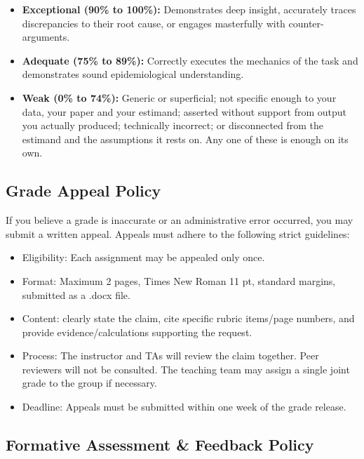 \documentclass[
]{article}
\providecommand{\tightlist}{%
  \setlength{\itemsep}{0pt}\setlength{\parskip}{0pt}}
\begin{document}
\begin{itemize}
\tightlist
\item
  \textbf{Exceptional (90\% to 100\%):} Demonstrates deep insight,
  accurately traces discrepancies to their root cause, or engages
  masterfully with counter-arguments.
\item
  \textbf{Adequate (75\% to 89\%):} Correctly executes the mechanics of
  the task and demonstrates sound epidemiological understanding.
\item
  \textbf{Weak (0\% to 74\%):} Generic or superficial; not specific
  enough to your data, your paper and your estimand; asserted without
  support from output you actually produced; technically incorrect; or
  disconnected from the estimand and the assumptions it rests on. Any
  one of these is enough on its own.
\end{itemize}

\subsection{Grade Appeal Policy}\label{grade-appeal-policy}

If you believe a grade is inaccurate or an administrative error
occurred, you may submit a written appeal. Appeals must adhere to the
following strict guidelines:

\begin{itemize}
\tightlist
\item
  Eligibility: Each assignment may be appealed only once.
\item
  Format: Maximum 2 pages, Times New Roman 11 pt, standard margins,
  submitted as a .docx file.
\item
  Content: clearly state the claim, cite specific rubric items/page
  numbers, and provide evidence/calculations supporting the request.
\item
  Process: The instructor and TAs will review the claim together. Peer
  reviewers will not be consulted. The teaching team may assign a single
  joint grade to the group if necessary.
\item
  Deadline: Appeals must be submitted within one week of the grade
  release.
\end{itemize}

\subsection{Formative Assessment \& Feedback
Policy}\label{formative-assessment-feedback-policy}
\end{document}
